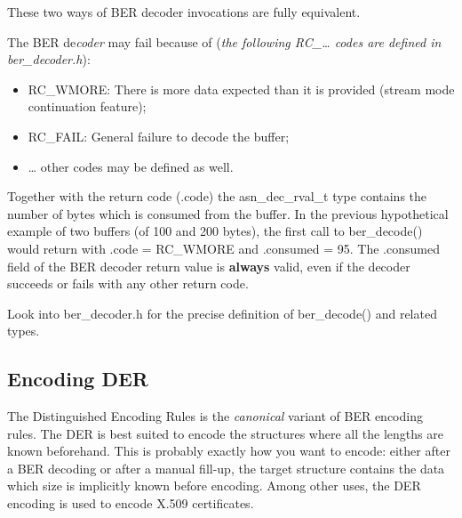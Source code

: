 \documentclass[english,oneside,12pt]{book}
\begin{document}
These two ways of BER decoder invocations are fully equivalent.

The BER de\emph{coder} may fail because of (\emph{the following RC\_\ldots{}
codes are defined in ber\_decoder.h}):
\begin{itemize}
\item RC\_WMORE: There is more data expected than it is provided (stream
mode continuation feature);
\item RC\_FAIL: General failure to decode the buffer;
\item \ldots{} other codes may be defined as well.
\end{itemize}
Together with the return code (.code) the asn\_dec\_rval\_t type contains
the number of bytes which is consumed from the buffer. In the previous
hypothetical example of two buffers (of 100 and 200 bytes), the first
call to ber\_decode() would return with .code = RC\_WMORE and .consumed
= 95. The .consumed field of the BER decoder return value is \textbf{always}
valid, even if the decoder succeeds or fails with any other return
code.

Look into ber\_decoder.h for the precise definition of ber\_decode()
and related types.


\subsection{\label{sub:Encoding-DER}Encoding DER}

The Distinguished Encoding Rules is the \emph{canonical} variant of
BER encoding rules. The DER is best suited to encode the structures
where all the lengths are known beforehand. This is probably exactly
how you want to encode: either after a BER decoding or after a manual
fill-up, the target structure contains the data which size is implicitly
known before encoding. Among other uses, the DER encoding is used
to encode X.509 certificates.
\end{document}
